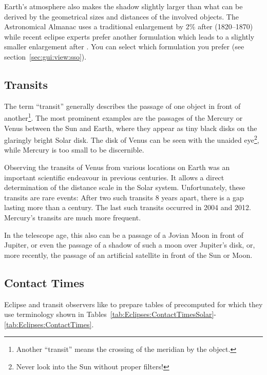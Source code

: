 Earth's atmosphere also makes the shadow slightly larger than what can
be derived by the geometrical sizes and distances of the involved
objects. The Astronomical Almanac uses a traditional enlargement by 2\% after
 (1820--1870) while recent eclipse experts prefer another
formulation which leads to a slightly smaller enlargement after  \citep{Espenak-Meeus:2009}. You
can select which formulation you prefer (see section~\ref{sec:gui:view:sso}).

\subsection{Transits}
\label{sec:Eclipses:Transits}

The term ``transit'' generally describes the passage of one object in
front of another\footnote{Another ``transit'' means the crossing of
  the meridian by the object.}. The most prominent examples are the
passages of the  Mercury or Venus between the Sun
and Earth, where they appear as tiny black disks on the glaringly
bright Solar disk. The disk of Venus can be seen with the unaided
eye\footnote{Never look into the Sun without proper filters!}, while
Mercury is too small to be discernible.

Observing the transits of Venus from various locations on Earth was an
important scientific endeavour in previous centuries. It allows a
direct determination of the distance scale in the Solar
system. Unfortunately, these transits are rare events: After two such
transits 8 years apart, there is a gap lasting more than a
century. The last such transits occurred in 2004 and 2012. Mercury's
transits are much more frequent.

In the telescope age, this also can be a passage of a Jovian Moon in
front of Jupiter, or even the passage of a shadow of such a moon over
Jupiter's disk, or, more recently, the passage of an artificial
satellite in front of the Sun or Moon.

\subsection{Contact Times}
\label{sec:Eclipses:ContactTimes}

Eclipse and transit observers like to prepare tables of precomputed
 for which they use terminology shown in
Tables~\ref{tab:Eclipses:ContactTimesSolar}-\ref{tab:Eclipses:ContactTimes}.

